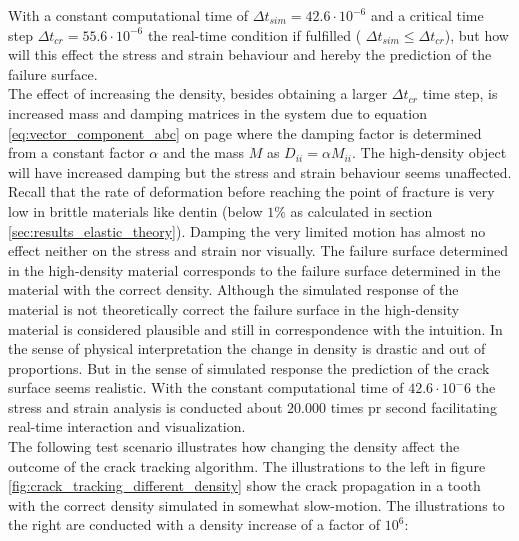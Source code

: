 With a constant computational time of $\Delta t_{sim} = 42.6 \cdot
10^{-6}$ and a critical time step $\Delta t_{cr} = 55.6 \cdot
10^{-6}$ the real-time condition if fulfilled ( $\Delta t_{sim} \le
\Delta t_{cr}$), but how will this effect the stress and strain
behaviour and hereby the prediction of the failure surface. \\

The effect of increasing the density, besides obtaining a larger $\Delta
t_{cr}$ time step, is increased mass and damping matrices in the system due to
equation \eqref{eq:vector_component_abc} on page
\pageref{eq:vector_component_abc} where the damping factor is
determined from a constant factor $\alpha$ and the mass $M$ as $
D_{ii} = \alpha M_{ii}$.
%
The high-density object will have
increased damping but the stress and strain behaviour seems unaffected.
Recall that the rate of deformation before reaching the point of
fracture is very low in brittle materials like dentin (below $1\%$ as
calculated in section \vref{sec:results_elastic_theory}). Damping
the very limited motion has almost no effect neither on the stress and
strain nor visually.
%
The failure surface determined in the high-density material corresponds
to the failure surface determined in the material with the correct density.
Although the simulated response of the material is not theoretically
correct the failure surface in the high-density material is considered
plausible and still in correspondence with the intuition. 
In the sense of physical interpretation the change in
density is drastic and out of proportions. But in the sense of
simulated response the prediction of the crack surface seems
realistic. With the constant computational time of $42.6 \cdot 10^-6$
the stress and strain analysis is conducted about $20.000$ times pr
second facilitating real-time interaction and visualization. \\

The following test scenario illustrates how changing the density
affect the outcome of the crack tracking algorithm. The illustrations
to the left in figure \vref{fig:crack_tracking_different_density}
show the crack propagation in a tooth with the correct density
simulated in somewhat slow-motion. The illustrations to
the right are conducted with a density increase of a factor of $10^6$:

